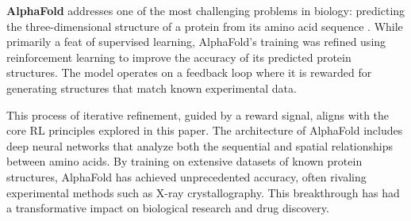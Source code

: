 \textbf{AlphaFold} addresses one of the most challenging problems in biology: predicting the three-dimensional structure of a protein from its amino acid sequence \cite{jumper2021highly}. While primarily a feat of supervised learning, AlphaFold's training was refined using reinforcement learning to improve the accuracy of its predicted protein structures. The model operates on a feedback loop where it is rewarded for generating structures that match known experimental data.

This process of iterative refinement, guided by a reward signal, aligns with the core RL principles explored in this paper. The architecture of AlphaFold includes deep neural networks that analyze both the sequential and spatial relationships between amino acids. By training on extensive datasets of known protein structures, AlphaFold has achieved unprecedented accuracy, often rivaling experimental methods such as X-ray crystallography. This breakthrough has had a transformative impact on biological research and drug discovery.
